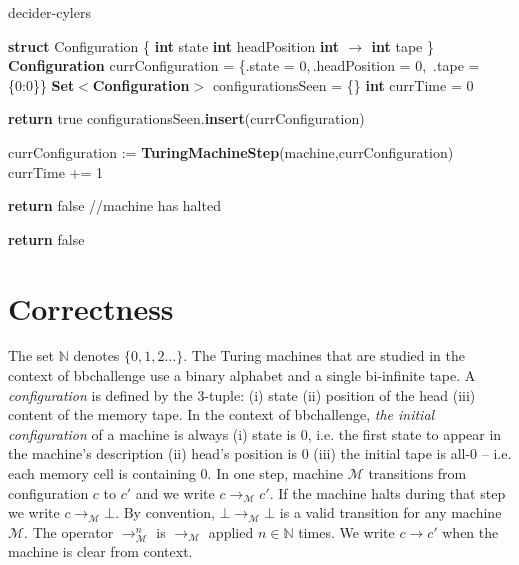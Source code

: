 \documentclass[a4paper,british]{article}
\newcommand{\tabi}{\hspace{\algorithmicindent}}
\begin{document}
\begin{algorithm}
        \caption{{\sc decider-cylers}}

        \begin{algorithmic}[1]

                \State \textbf{struct} Configuration \{
                \State \tabi\textbf{int} state
                \State \tabi\textbf{int} headPosition
                \State \tabi\textbf{int $\boldsymbol{\to}$ int} tape
                \State \}
                \State \textbf{Configuration} currConfiguration = \{.state = 0,$\,$.headPosition = 0,$\,$ .tape = \{0:0\}\}
                \State \textbf{Set$\boldsymbol{<}$Configuration$\boldsymbol{>}$} configurationsSeen = \{\}
                \State \textbf{int} currTime = 0

                \State \textbf{return} true
                \EndIf
                \State configurationsSeen.\textbf{insert}(currConfiguration)

                \State currConfiguration := \textbf{TuringMachineStep}(machine,currConfiguration)
                \State currTime += 1


                \State \textbf{return} false //machine has halted
                \EndIf
                \EndWhile

                \State \textbf{return} false
                \EndProcedure

        \end{algorithmic}
\end{algorithm}

\section{Correctness}

The set $\mathbb{N}$ denotes $\{0,1,2\dots\}$. The Turing machines that are studied in the context of bbchallenge use a binary alphabet and a single bi-infinite tape. A \textit{configuration} is defined by the 3-tuple: (i) state (ii) position of the head (iii) content of the memory tape. In the context of bbchallenge, \textit{the initial configuration} of a machine is always (i) state is 0, i.e. the first state to appear in the machine's description (ii) head's position is 0 (iii) the initial tape is all-0 -- i.e. each memory cell is containing 0. In one step, machine $\mathcal{M}$ transitions from configuration $c$ to $c'$ and we write $c \to_\mathcal{M} c'$. If the machine halts during that step we write $c \to_\mathcal{M} \bot$. By convention, $\bot \to_\mathcal{M} \bot$ is a valid transition for any machine $\mathcal{M}$.  The operator $\to_\mathcal{M}^n$ is $\to_\mathcal{M}$ applied $n\in\mathbb{N}$ times. We write $c \to c'$ when the machine is clear from context.
\end{document}
